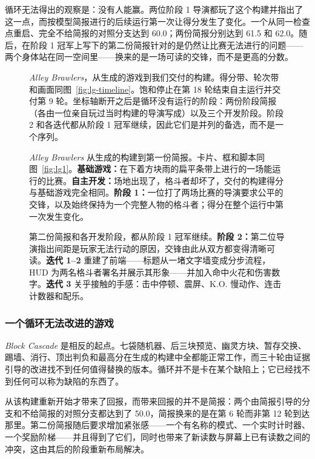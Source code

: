 循环无法得出的观察是：没有人能赢。两位阶段 1 导演都玩了这个构建并指出了这一点，而按模型简报进行的后续运行第一次让得分发生了变化。一个从同一检查点重启、完全不给简报的对照分支达到 60.0；两份简报分别达到 61.5 和 62.0。随后，在阶段 1 冠军上写下的第二份简报针对的是仍然让比赛无法进行的问题——两个身体站在同一空间里——换来的是一场可读的交锋，而不是更高的分数。

\begin{figure}[h]
\centering
{}
\caption{\textit{Alley Brawlers}，从生成的游戏到我们交付的构建。得分带、轮次带和画面同图~\ref{fig:lg-timeline}。饱和停止在第 18 轮结束自主运行并交付第 9 轮。坐标轴断开之后是循环没有运行的阶段：两份阶段简报（各由一位亲自玩过当时构建的导演写成）以及三个开发阶段。阶段 2 和各迭代都从阶段 1 冠军继续，因此它们是并列的备选，而不是一个序列。}
\label{fig:ab-timeline}
\end{figure}

\begin{figure}[p]
\centering
{}
\caption{\textit{Alley Brawlers} 从生成的构建到第一份简报。卡片、框和脚本同图~\ref{fig:lg1}。\textbf{基础游戏：}在下着方块雨的扁平条带上进行的一场能运行的比赛。\textbf{自主开发：}场地出现了，格斗者却坏了，交付的构建得分与基础游戏完全相同。\textbf{阶段 1：}一位打了两场比赛的导演要求公平的交锋，以及始终保持为一个完整人物的格斗者；得分在整个运行中第一次发生变化。}
\label{fig:ab1}
\end{figure}

\begin{figure}[p]
\centering
{}
\caption{第二份简报和各开发阶段，都从阶段 1 冠军继续。\textbf{阶段 2：}第二位导演指出间距是玩家无法行动的原因，交锋由此从双方都变得清晰可读。\textbf{迭代 1–2} 重建了前端——标题从一堵文字墙变成分步流程，HUD 为两名格斗者署名并展示其形象——并加入命中火花和伤害数字。\textbf{迭代 3} 关乎接触的手感：击中停顿、震屏、K.O. 慢动作、连击计数器和配乐。}
\label{fig:ab2}
\end{figure}

\subsubsection{一个循环无法改进的游戏}\label{app:case3}
\textit{Block Cascade} 是相反的起点。七袋随机器、后三块预览、幽灵方块、暂存交换、踢墙、消行、顶出判负和最高分在生成的构建中全都能正常工作，而三十轮由证据引导的改进找不到任何值得替换的版本。循环并不是卡在某个缺陷上；它已经找不到任何可以称为缺陷的东西了。

从该构建重新开始才带来了回报，而带来回报的并不是简报：两个由简报引导的分支和不给简报的对照分支都达到了 50.0，简报换来的是在第 6 轮而非第 12 轮到达那里。第二份简报随后要求增加紧张感——一个有名称的模式、一个实时计时器、一个奖励阶梯——并且得到了它们，同时也带来了新读数与屏幕上已有读数之间的冲突，这由其后的阶段重新布局解决。

